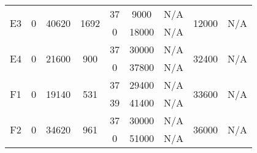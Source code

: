 \begin{sidewaystable}
\begin{tabular}{c||c|c|c||c|c|c|c||c|c|c}
         &
        
      \\
      \hline
      \multirow{2}{*}{E3} &
      \multirow{2}{*}{0} &
      \multirow{2}{*}{40620} &
      \multirow{2}{*}{1692} &
      37 &
      9000 &
        \multicolumn{2}{|c||}{N/A} &
      \multirow{2}{*}{12000} &
        \multicolumn{2}{c}{\multirow{2}{*}{N/A}}
      \\
      \cline{5-8}
       &
       &
       &
       &
      0 &
      18000 &
        \multicolumn{2}{|c||}{N/A} &
      
        
      \\
      \hline
      \multirow{2}{*}{E4} &
      \multirow{2}{*}{0} &
      \multirow{2}{*}{21600} &
      \multirow{2}{*}{900} &
      37 &
      30000 &
        \multicolumn{2}{|c||}{N/A} &
      \multirow{2}{*}{32400} &
        \multicolumn{2}{c}{\multirow{2}{*}{N/A}}
      \\
      \cline{5-8}
       &
       &
       &
       &
      0 &
      37800 &
        \multicolumn{2}{|c||}{N/A} &
      
        
      \\
      \hline
      \multirow{2}{*}{F1} &
      \multirow{2}{*}{0} &
      \multirow{2}{*}{19140} &
      \multirow{2}{*}{531} &
      37 &
      29400 &
        \multicolumn{2}{|c||}{N/A} &
      \multirow{2}{*}{33600} &
        \multicolumn{2}{c}{\multirow{2}{*}{N/A}}
      \\
      \cline{5-8}
       &
       &
       &
       &
      39 &
      41400 &
        \multicolumn{2}{|c||}{N/A} &
      
        
      \\
      \hline
      \multirow{2}{*}{F2} &
      \multirow{2}{*}{0} &
      \multirow{2}{*}{34620} &
      \multirow{2}{*}{961} &
      37 &
      30000 &
        \multicolumn{2}{|c||}{N/A} &
      \multirow{2}{*}{36000} &
        \multicolumn{2}{c}{\multirow{2}{*}{N/A}}
      \\
      \cline{5-8}
       &
       &
       &
       &
      0 &
      51000 &
        \multicolumn{2}{|c||}{N/A} &
      
        
      \\
\end{tabular}
\label{table:RASDATASET2} 
\end{sidewaystable}